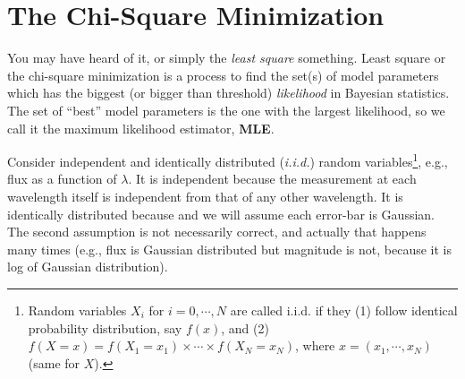 \section{The Chi-Square Minimization}
You may have heard of it, or simply the \textit{least square} something. Least square or the chi-square minimization is a process to find the set(s) of model parameters which has the biggest (or bigger than threshold) \textit{likelihood} in Bayesian statistics. The set of ``best'' model parameters is the one with the largest likelihood, so we call it the maximum likelihood estimator, \textbf{MLE}.

Consider independent and identically distributed (\textit{i.i.d.}) random variables\footnote{Random variables $ X_{i} $ for $ i = 0, \cdots, N $ are called i.i.d. if they (1) follow identical probability distribution, say $ f(x) $, and (2) $ f(X = x) = f(X_1 = x_1) \times \cdots \times f(X_N = x_N) $, where $ x = (x_1, \cdots , x_N) $ (same for $ X $). }, e.g., flux as a function of $ \lambda $. It is independent because the measurement at each wavelength itself is independent from that of any other wavelength. It is identically distributed because and we will assume each error-bar is Gaussian. The second assumption is not necessarily correct, and actually that happens many times (e.g., flux is Gaussian distributed but magnitude is not, because it is log of Gaussian distribution).

